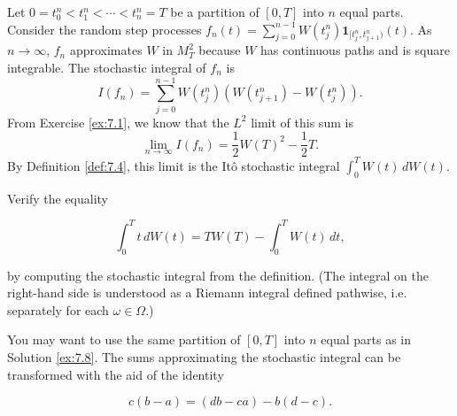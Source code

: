 \begin{Solution}
Let $0 = t_0^n < t_1^n < \cdots < t_n^n = T$ be a partition of $[0, T]$ into $n$ equal parts. Consider the random step processes $f_n(t) = \sum_{j=0}^{n-1} W(t_j^n) \mathbf{1}_{[t_j^n, t_{j+1}^n)}(t)$. As $n \to \infty$, $f_n$ approximates $W$ in $M_T^2$ because $W$ has continuous paths and is square integrable.
The stochastic integral of $f_n$ is
\begin{equation*}
I(f_n) = \sum_{j=0}^{n-1} W(t_j^n)(W(t_{j+1}^n) - W(t_j^n)).
\end{equation*}
From Exercise \ref{ex:7.1}, we know that the $L^2$ limit of this sum is
\begin{equation*}
\lim_{n \to \infty} I(f_n) = \frac{1}{2} W(T)^2 - \frac{1}{2} T.
\end{equation*}
By Definition \ref{def:7.4}, this limit is the Itô stochastic integral $\int_0^T W(t) \, dW(t)$.
\end{Solution}

\begin{Exercise}
\label{ex:7.9}
Verify the equality

\begin{equation}
\int_0^T t \, dW(t) = T W(T) - \int_0^T W(t) \, dt,
\end{equation}

by computing the stochastic integral from the definition. (The integral on the right-hand side is understood as a Riemann integral defined pathwise, i.e. separately for each $\omega \in \Omega$.)

\begin{hint}
You may want to use the same partition of $[0, T]$ into $n$ equal parts as in Solution \ref{ex:7.8}. The sums approximating the stochastic integral can be transformed with the aid of the identity

\begin{equation}
c(b - a) = (db - ca) - b(d - c).
\end{equation}
\end{hint}
\end{Exercise}

